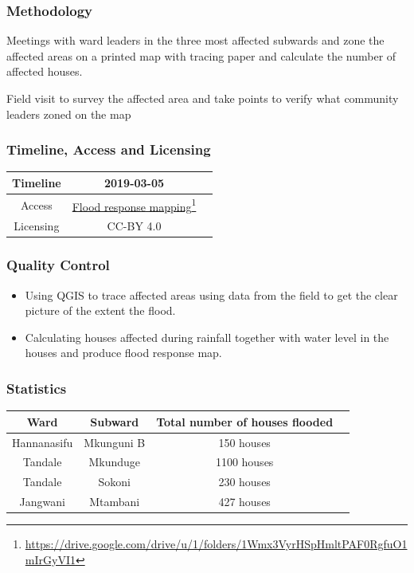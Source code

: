 \documentclass[a4paper,12pt,twoside]{article}
\begin{document}
\subsubsection{Methodology}
Meetings with ward leaders in the three most affected subwards and zone the affected areas on a printed map with tracing paper and calculate the number of affected houses.

Field visit to survey the affected area and take points to verify what community leaders zoned on the map

\medskip
\subsubsection{Timeline, Access and Licensing}
\begin{center}
\begin{tabular}{|c|c|c|}  
 \hline
  Timeline  &  2019-03-05 \\
\hline  
 Access  & 
   \href{https://drive.google.com/drive/u/1/folders/1Wmx3VyrHSpHmltPAF0RgfuO1mIrGyVI1}{Flood response mapping}\footnote{\url{https://drive.google.com/drive/u/1/folders/1Wmx3VyrHSpHmltPAF0RgfuO1mIrGyVI1}} \\
  
\hline
Licensing   &  CC-BY 4.0 \\
\hline

\end{tabular}
\end{center}

\subsubsection{Quality Control}
\begin{itemize}
    \item Using QGIS to trace affected areas using data from the field to get the clear picture of the extent the flood. 
   \item Calculating houses affected during rainfall together with  water level in the houses  and produce flood response map.
\end{itemize}

\subsubsection{Statistics}
\begin{center}
\begin{tabular}{|c|c|c|c|}
\hline
Ward & Subward & Total number of houses flooded \\
\hline
Hannanasifu & Mkunguni B & 150 houses \\
\hline
Tandale & Mkunduge & 1100 houses \\
\hline
Tandale & Sokoni & 230 houses \\
\hline
Jangwani & Mtambani & 427 houses \\
\hline
\end{tabular}
\end{center}
\newpage
\end{document}
